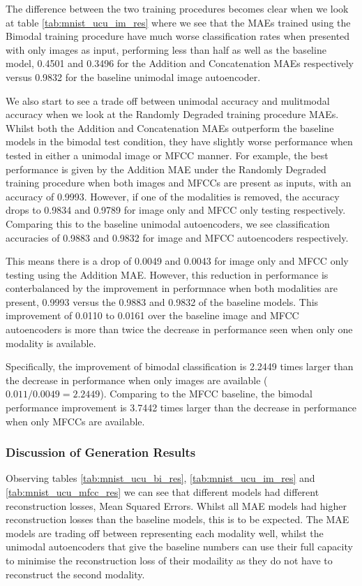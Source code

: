 The difference between the two training procedures becomes clear when we look at table \ref{tab:mnist_ucu_im_res} where we see that the MAEs trained using the Bimodal training procedure have much worse classification rates when presented with only images as input, performing less than half as well as the baseline model, 0.4501 and 0.3496 for the Addition and Concatenation MAEs respectively versus 0.9832 for the baseline unimodal image autoencoder.

We also start to see a trade off between unimodal accuracy and mulitmodal accuracy when we look at the Randomly Degraded training procedure MAEs. Whilst both the Addition and Concatenation MAEs outperform the baseline models in the bimodal test condition, they have slightly worse performance when tested in either a unimodal image or MFCC manner. For example, the best performance is given by the Addition MAE under the Randomly Degraded training procedure when both images and MFCCs are present as inputs, with an accuracy of 0.9993. However, if one of the modalities is removed, the accuracy drops to 0.9834 and 0.9789 for image only and MFCC only testing respectively. Comparing this to the baseline unimodal autoencoders, we see classification accuracies of 0.9883 and 0.9832 for image and MFCC autoencoders respectively. 

This means there is a drop of 0.0049 and 0.0043 for image only and MFCC only testing using the Addition MAE. However, this reduction in performance is conterbalanced by the improvement in performnace when both modalities are present, 0.9993 versus the 0.9883 and 0.9832 of the baseline models. This improvement of 0.0110 to 0.0161 over the baseline image and MFCC autoencoders is more than twice the decrease in performance seen when only one modality is available. 

Specifically, the improvement of bimodal classification is 2.2449 times larger than the decrease in performance when only images are available ($0.011 / 0.0049 = 2.2449$). Comparing to the MFCC baseline, the bimodal performance improvement is 3.7442 times larger than the decrease in performance when only MFCCs are available.

\subsubsection{Discussion of Generation Results}
Observing tables \ref{tab:mnist_ucu_bi_res}, \ref{tab:mnist_ucu_im_res} and \ref{tab:mnist_ucu_mfcc_res} we can see that different models had different reconstruction losses, Mean Squared Errors. Whilst all MAE models had higher reconstruction losses than the baseline models, this is to be expected. The MAE models are trading off between representing each modality well, whilst the unimodal autoencoders that give the baseline numbers can use their full capacity to minimise the reconstruction loss of their modaility as they do not have to reconstruct the second modality. 

